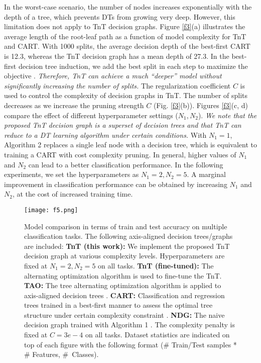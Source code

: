 \documentclass{article}
\begin{document}
In the worst-case scenario, the number of nodes increases exponentially with the depth of a tree, which prevents DTs from growing very deep. However, this limitation does not apply to TnT decision graphs. Figure \ref{f3}(a) illustrates the average length of the root-leaf path as a function of model complexity for TnT and CART. With 1000 splits, the average decision depth of the best-first CART is 12.3, whereas the TnT decision graph has a mean depth of 27.3. In the best-first decision tree induction, we add the best split in each step to maximize the objective \cite{shi2007best}. \textit{Therefore, TnT can achieve a much ``deeper'' model without significantly increasing the number of splits.} The regularization coefficient $C$ is used to control the complexity of decision graphs in TnT. The number of splits decreases as we increase the pruning strength $C$ (Fig. \ref{f3}(b)). Figures \ref{f3}(c, d) compare the effect of different hyperparameter settings ($N_1, N_2$). \textit{We note that the proposed TnT decision graph is a superset of decision trees and that TnT can reduce to a DT learning algorithm under certain conditions.} With $N_1=1$, Algorithm 2 replaces a single leaf node with a decision tree, which is equivalent to training a CART with cost complexity pruning. In general, higher values of $N_1$ and $N_2$ can lead to a better classification performance. In the following experiments, we set the hyperparameters as $N_1=2, N_2=5$. A marginal improvement in classification performance can be obtained by increasing $N_1$ and $N_2$, at the cost of increased training time. 

\begin{figure}
  \centering
  \texttt{[image: f5.png]}
  \caption{Model comparison in terms of train and test accuracy on multiple classification tasks. The following axis-aligned decision trees/graphs are included: \textbf{TnT (this work):} We implement the proposed TnT decision graph at various complexity levels. Hyperparameters are fixed at $N_1=2, N_2=5$ on all tasks. \textbf{TnT (fine-tuned):} The alternating optimization algorithm is used to fine-tune the TnT. \textbf{TAO:} The tree alternating optimization algorithm is applied to axis-aligned decision trees \cite{zharmagambetov2019experimental}. \textbf{CART:} Classification and regression trees trained in a best-first manner to assess the optimal tree structure under certain complexity constraint \cite{steinberg2009cart,shi2007best}. \textbf{NDG:} The naive decision graph trained with Algorithm 1 \cite{oliver1992decision}. The complexity penalty is fixed at $C=3e-4$ on all tasks. Dataset statistics are indicated on top of each figure with  the following format ($\#$ Train/Test samples * $\#$ Features, $\#$~Classes). }
  \vspace{-3mm}
  \label{f4}
\end{figure}
\end{document}
